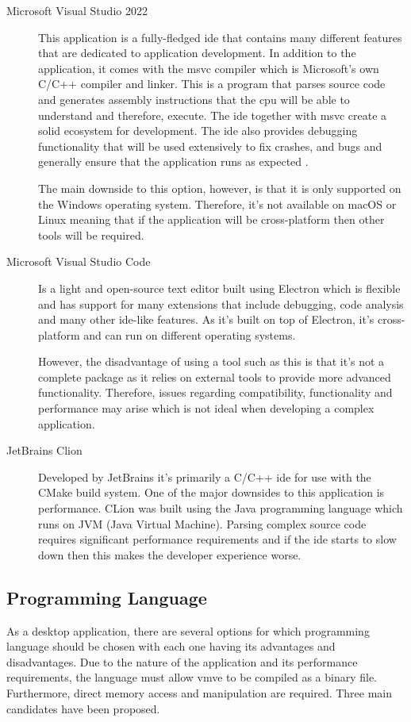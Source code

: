 \documentclass[11pt]{article}
\begin{document}
\begin{description}
  \item[Microsoft Visual Studio 2022] This application is a fully-fledged
    \gls*{ide} that contains many different features that are dedicated to
    application development. In addition to the application, it comes with the
    \gls*{msvc} compiler which is Microsoft's own C/C++ compiler and linker.
    This is a program that parses source code and generates assembly
    instructions that the \gls*{cpu} will be able to understand and therefore,
    execute. The \gls*{ide} together with \gls*{msvc} create a solid ecosystem
    for development. The \gls*{ide} also provides debugging functionality that
    will be used extensively to fix crashes, and bugs and generally ensure that
    the application runs as expected \cite{visualstudio}. 

    The main downside to this option, however, is that it is only supported on
    the Windows operating system. Therefore, it's not available on macOS or
    Linux meaning that if the application will be cross-platform then other
    tools will be required.

  \item[Microsoft Visual Studio Code] Is a light and open-source text editor
    built using Electron which is flexible and has support for many extensions
    that include debugging, code analysis and many other ide-like features. As
    it's built on top of Electron, it's cross-platform and can run on different
    operating systems.

    However, the disadvantage of using a tool such as this is that it's not a
    complete package as it relies on external tools to provide more advanced
    functionality. Therefore, issues regarding compatibility, functionality and
    performance may arise which is not ideal when developing a complex
    application.
  
  \item[JetBrains Clion] Developed by JetBrains it's primarily a C/C++
    \gls*{ide} for use with the CMake build system. One of the major downsides
    to this application is performance. CLion was built using the Java
    programming language which runs on JVM (Java Virtual Machine). Parsing
    complex source code requires significant performance requirements and if the
    \gls*{ide} starts to slow down then this makes the developer experience
    worse.
\end{description}

\subsection{Programming Language} \label{programming_language}
As a desktop application, there are several options for which programming
language should be chosen with each one having its advantages and disadvantages.
Due to the nature of the application and its performance requirements, the
language must allow \gls*{vmve} to be compiled as a binary file. Furthermore,
direct memory access and manipulation are required. Three main candidates have
been proposed.
\end{document}
